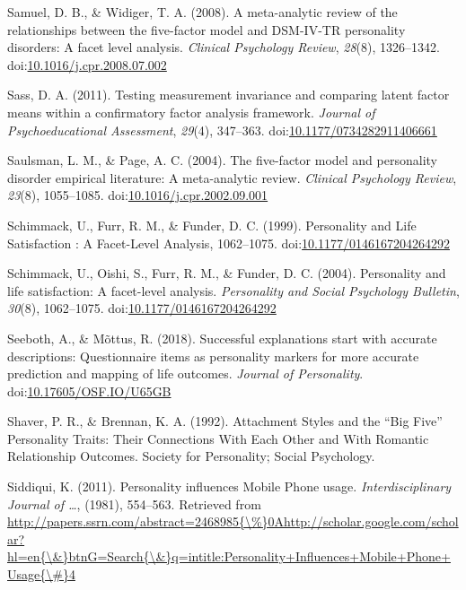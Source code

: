 \documentclass[,man,floatsintext]{apa6}
\begin{document}
\hypertarget{ref-SamuelWidiger2008}{}
Samuel, D. B., \& Widiger, T. A. (2008). A meta-analytic review of the
relationships between the five-factor model and DSM-IV-TR personality
disorders: A facet level analysis. \emph{Clinical Psychology Review},
\emph{28}(8), 1326--1342.
doi:\href{https://doi.org/10.1016/j.cpr.2008.07.002}{10.1016/j.cpr.2008.07.002}

\hypertarget{ref-Sass2011}{}
Sass, D. A. (2011). Testing measurement invariance and comparing latent
factor means within a confirmatory factor analysis framework.
\emph{Journal of Psychoeducational Assessment}, \emph{29}(4), 347--363.
doi:\href{https://doi.org/10.1177/0734282911406661}{10.1177/0734282911406661}

\hypertarget{ref-SaulsmanPage2004}{}
Saulsman, L. M., \& Page, A. C. (2004). The five-factor model and
personality disorder empirical literature: A meta-analytic review.
\emph{Clinical Psychology Review}, \emph{23}(8), 1055--1085.
doi:\href{https://doi.org/10.1016/j.cpr.2002.09.001}{10.1016/j.cpr.2002.09.001}

\hypertarget{ref-Schimmack1999}{}
Schimmack, U., Furr, R. M., \& Funder, D. C. (1999). Personality and
Life Satisfaction : A Facet-Level Analysis, 1062--1075.
doi:\href{https://doi.org/10.1177/0146167204264292}{10.1177/0146167204264292}

\hypertarget{ref-Schimmack2004}{}
Schimmack, U., Oishi, S., Furr, R. M., \& Funder, D. C. (2004).
Personality and life satisfaction: A facet-level analysis.
\emph{Personality and Social Psychology Bulletin}, \emph{30}(8),
1062--1075.
doi:\href{https://doi.org/10.1177/0146167204264292}{10.1177/0146167204264292}

\hypertarget{ref-Seeboth2018}{}
Seeboth, A., \& Mõttus, R. (2018). Successful explanations start with
accurate descriptions: Questionnaire items as personality markers for
more accurate prediction and mapping of life outcomes. \emph{Journal of
Personality}.
doi:\href{https://doi.org/10.17605/OSF.IO/U65GB}{10.17605/OSF.IO/U65GB}

\hypertarget{ref-Shaver1992}{}
Shaver, P. R., \& Brennan, K. A. (1992). Attachment Styles and the ``Big
Five'' Personality Traits: Their Connections With Each Other and With
Romantic Relationship Outcomes. Society for Personality; Social
Psychology.

\hypertarget{ref-Siddiqui2011}{}
Siddiqui, K. (2011). Personality influences Mobile Phone usage.
\emph{Interdisciplinary Journal of \ldots{}}, (1981), 554--563.
Retrieved from
\href{http://papers.ssrn.com/abstract=2468985\%7B/\%\%7D0Ahttp://scholar.google.com/scholar?hl=en\%7B/\&\%7DbtnG=Search\%7B/\&\%7Dq=intitle:Personality+Influences+Mobile+Phone+Usage\%7B/\#\%7D4}{http://papers.ssrn.com/abstract=2468985\{\textbackslash{}\%\}0Ahttp://scholar.google.com/scholar?hl=en\{\textbackslash{}\&\}btnG=Search\{\textbackslash{}\&\}q=intitle:Personality+Influences+Mobile+Phone+Usage\{\textbackslash{}\#\}4}
\end{document}
